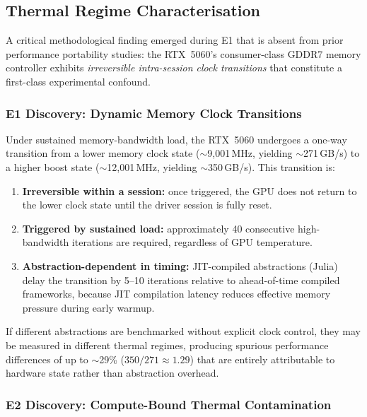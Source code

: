 \subsection{Thermal Regime Characterisation}
\label{subsec:thermal}

A critical methodological finding emerged during E1 that is absent from prior
performance portability studies: the RTX~5060's consumer-class GDDR7 memory
controller exhibits \emph{irreversible intra-session clock transitions} that
constitute a first-class experimental confound.

\subsubsection{E1 Discovery: Dynamic Memory Clock Transitions}

Under sustained memory-bandwidth load, the RTX~5060 undergoes a one-way
transition from a lower memory clock state ($\sim$9{,}001\,MHz, yielding
$\sim$271\,GB/s) to a higher boost state ($\sim$12{,}001\,MHz, yielding
$\sim$350\,GB/s). This transition is:

\begin{enumerate}
    \item \textbf{Irreversible within a session:} once triggered, the GPU does
    not return to the lower clock state until the driver session is fully reset.
    \item \textbf{Triggered by sustained load:} approximately 40 consecutive
    high-bandwidth iterations are required, regardless of GPU temperature.
    \item \textbf{Abstraction-dependent in timing:} JIT-compiled abstractions
    (Julia) delay the transition by 5--10 iterations relative to ahead-of-time
    compiled frameworks, because JIT compilation latency reduces effective
    memory pressure during early warmup.
\end{enumerate}

\noindent If different abstractions are benchmarked without explicit clock
control, they may be measured in different thermal regimes, producing spurious
performance differences of up to $\sim$29\% ($350 / 271 \approx 1.29$) that are
entirely attributable to hardware state rather than abstraction overhead.

\subsubsection{E2 Discovery: Compute-Bound Thermal Contamination}

